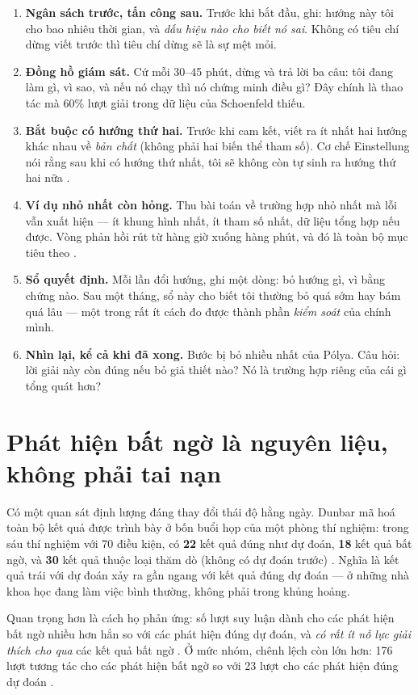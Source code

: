 \documentclass[../hieu-suat.tex]{subfiles}
\begin{document}
\begin{enumerate}
\item \textbf{Ngân sách trước, tấn công sau.} Trước khi bắt đầu, ghi: hướng này tôi cho bao nhiêu thời gian, và \emph{dấu hiệu nào cho biết nó sai}. Không có tiêu chí dừng viết trước thì tiêu chí dừng sẽ là sự mệt mỏi.
\item \textbf{Đồng hồ giám sát.} Cứ mỗi 30--45 phút, dừng và trả lời ba câu: tôi đang làm gì, vì sao, và nếu nó chạy thì nó chứng minh điều gì? Đây chính là thao tác mà 60\% lượt giải trong dữ liệu của Schoenfeld thiếu.
\item \textbf{Bắt buộc có hướng thứ hai.} Trước khi cam kết, viết ra ít nhất hai hướng khác nhau về \emph{bản chất} (không phải hai biến thể tham số). Cơ chế Einstellung nói rằng sau khi có hướng thứ nhất, tôi sẽ không còn tự sinh ra hướng thứ hai nữa \cite{bilalic2008}.
\item \textbf{Ví dụ nhỏ nhất còn hỏng.} Thu bài toán về trường hợp nhỏ nhất mà lỗi vẫn xuất hiện --- ít khung hình nhất, ít tham số nhất, dữ liệu tổng hợp nếu được. Vòng phản hồi rút từ hàng giờ xuống hàng phút, và đó là toàn bộ mục tiêu theo .
\item \textbf{Sổ quyết định.} Mỗi lần đổi hướng, ghi một dòng: bỏ hướng gì, vì bằng chứng nào. Sau một tháng, sổ này cho biết tôi thường bỏ quá sớm hay bám quá lâu --- một trong rất ít cách đo được thành phần \emph{kiểm soát} của chính mình.
\item \textbf{Nhìn lại, kể cả khi đã xong.} Bước bị bỏ nhiều nhất của Pólya. Câu hỏi: lời giải này còn đúng nếu bỏ giả thiết nào? Nó là trường hợp riêng của cái gì tổng quát hơn?
\end{enumerate}

\section{Phát hiện bất ngờ là nguyên liệu, không phải tai nạn}

Có một quan sát định lượng đáng thay đổi thái độ hằng ngày. Dunbar \cite{dunbar1997} mã hoá toàn bộ kết quả được trình bày ở bốn buổi họp của một phòng thí nghiệm: trong sáu thí nghiệm với 70 điều kiện, có \textbf{22} kết quả đúng như dự đoán, \textbf{18} kết quả bất ngờ, và \textbf{30} kết quả thuộc loại thăm dò (không có dự đoán trước) \nD{}. Nghĩa là kết quả trái với dự đoán xảy ra gần ngang với kết quả đúng dự đoán --- ở những nhà khoa học đang làm việc bình thường, không phải trong khủng hoảng.

Quan trọng hơn là cách họ phản ứng: số lượt suy luận dành cho các phát hiện bất ngờ nhiều hơn hẳn so với các phát hiện đúng dự đoán, và \emph{có rất ít nỗ lực giải thích cho qua} các kết quả bất ngờ \nD{}. Ở mức nhóm, chênh lệch còn lớn hơn: 176 lượt tương tác cho các phát hiện bất ngờ so với 23 lượt cho các phát hiện đúng dự đoán \nD{}.
\end{document}

